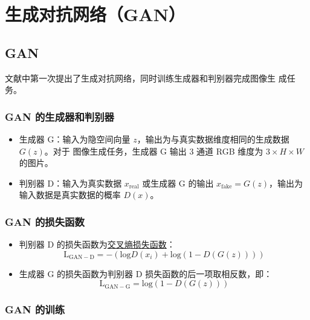 \chapter{生成对抗网络（GAN）}

\section{GAN}

文献中第一次提出了生成对抗网络，同时训练生成器和判别器完成图像生
成任务。

\subsection{GAN 的生成器和判别器}

\begin{itemize}
  \item 生成器 G：输入为隐空间向量 $z$，输出为与真实数据维度相同的生成数据 $G(z)$。对于
    图像生成任务，生成器 G 输出 3 通道 RGB 维度为 $3 \times H \times W$ 的图片。
  \item 判别器 D：输入为真实数据 $x_{\mathrm{real}}$ 或生成器 G 的输出
    $x_{\mathrm{fake}} = G(z)$，输出为输入数据是真实数据的概率 $D(x)$。
\end{itemize}

\subsection{GAN 的损失函数}
\begin{itemize}
  \item 判别器 D 的损失函数为\hyperref[subsec:CELoss]{交叉熵损失函数}：
  \begin{equation}
    \label{equ:GAN-D}
    \mathrm{L}_{\mathrm{GAN-D}} = - \left( \mathrm{log} D(x_i) + \mathrm{log} (1-D(G(z))) \right )
  \end{equation}

  \item 生成器 G 的损失函数为判别器 D 损失函数的后一项取相反数，即：
  \begin{equation}
    \label{equ:GAN-G}
    \mathrm{L}_{\mathrm{GAN-G}} =  \mathrm{log} (1-D(G(z)))
  \end{equation}

\end{itemize}

\subsection{GAN 的训练}

